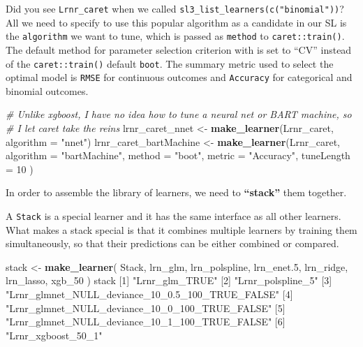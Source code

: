 \documentclass[12pt, krantz2,]{krantz}
\newenvironment{Shaded}{\begin{snugshade}}{\end{snugshade}}
\newcommand{\CommentTok}[1]{\textcolor[rgb]{0.37,0.37,0.37}{\textit{#1}}}
\newcommand{\DataTypeTok}[1]{\textcolor[rgb]{0.27,0.27,0.27}{#1}}
\newcommand{\DecValTok}[1]{\textcolor[rgb]{0.06,0.06,0.06}{#1}}
\newcommand{\FloatTok}[1]{\textcolor[rgb]{0.06,0.06,0.06}{#1}}
\newcommand{\KeywordTok}[1]{\textcolor[rgb]{0.27,0.27,0.27}{\textbf{#1}}}
\newcommand{\NormalTok}[1]{#1}
\newcommand{\StringTok}[1]{\textcolor[rgb]{0.5,0.5,0.5}{#1}}
\theoremstyle{definition}
\theoremstyle{definition}
\theoremstyle{definition}
\newcommand{\1}{\mathbbm{1}}
\begin{document}
Did you see \texttt{Lrnr\_caret} when we called \texttt{sl3\_list\_learners(c("binomial"))}?
All we need to specify to use this popular algorithm as a candidate in our
SL is the \texttt{algorithm} we want to tune, which is passed as \texttt{method} to
\texttt{caret::train()}. The default method for parameter selection criterion with is
set to ``CV'' instead of the \texttt{caret::train()} default \texttt{boot}. The summary metric
used to select the optimal model is \texttt{RMSE} for continuous outcomes and
\texttt{Accuracy} for categorical and binomial outcomes.

\begin{Shaded}
\begin{Highlighting}[]
\CommentTok{# Unlike xgboost, I have no idea how to tune a neural net or BART machine, so}
\CommentTok{# I let caret take the reins}
\NormalTok{lrnr_caret_nnet <-}\StringTok{ }\KeywordTok{make_learner}\NormalTok{(Lrnr_caret, }\DataTypeTok{algorithm =} \StringTok{"nnet"}\NormalTok{)}
\NormalTok{lrnr_caret_bartMachine <-}\StringTok{ }\KeywordTok{make_learner}\NormalTok{(Lrnr_caret,}
  \DataTypeTok{algorithm =} \StringTok{"bartMachine"}\NormalTok{,}
  \DataTypeTok{method =} \StringTok{"boot"}\NormalTok{, }\DataTypeTok{metric =} \StringTok{"Accuracy"}\NormalTok{,}
  \DataTypeTok{tuneLength =} \DecValTok{10}
\NormalTok{)}
\end{Highlighting}
\end{Shaded}

In order to assemble the library of learners, we need to \textbf{``stack''} them
together.

A \texttt{Stack} is a special learner and it has the same interface as all other
learners. What makes a stack special is that it combines multiple learners by
training them simultaneously, so that their predictions can be either combined
or compared.

\begin{Shaded}
\begin{Highlighting}[]
\NormalTok{stack <-}\StringTok{ }\KeywordTok{make_learner}\NormalTok{(}
\NormalTok{  Stack, lrn_glm, lrn_polspline, lrn_enet}\FloatTok{.5}\NormalTok{, lrn_ridge, lrn_lasso, xgb_}\DecValTok{50}
\NormalTok{)}
\NormalTok{stack}
\NormalTok{[}\DecValTok{1}\NormalTok{] }\StringTok{"Lrnr_glm_TRUE"}                                  
\NormalTok{[}\DecValTok{2}\NormalTok{] }\StringTok{"Lrnr_polspline_5"}                               
\NormalTok{[}\DecValTok{3}\NormalTok{] }\StringTok{"Lrnr_glmnet_NULL_deviance_10_0.5_100_TRUE_FALSE"}
\NormalTok{[}\DecValTok{4}\NormalTok{] }\StringTok{"Lrnr_glmnet_NULL_deviance_10_0_100_TRUE_FALSE"}  
\NormalTok{[}\DecValTok{5}\NormalTok{] }\StringTok{"Lrnr_glmnet_NULL_deviance_10_1_100_TRUE_FALSE"}  
\NormalTok{[}\DecValTok{6}\NormalTok{] }\StringTok{"Lrnr_xgboost_50_1"}                              
\end{Highlighting}
\end{Shaded}
\end{document}
